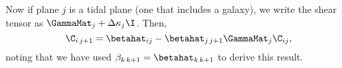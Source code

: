Now if plane $j$ is a tidal plane (one that includes a galaxy), we write the shear tensor as $\GammaMat_j + \Delta \kappa_j \I$. Then,
\begin{equation}
\C_{i \, j +1} = \betahat_{i j}  - \betahat_{j \, j+1} \GammaMat_j \C_{i j},
\end{equation}
noting that we have used $\beta_{k \, k+1} = \betahat_{k\, k+1}$ to derive this result.
  